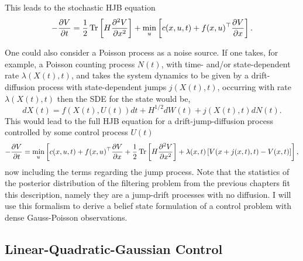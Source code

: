 This leads to the stochastic HJB equation
\begin{equation}
\label{eq:stochastic_HJB}
-\frac{\partial V}{\partial t} = \frac{1}{2} \Tr\left[H \frac{\partial^2 V}{\partial x^2} \right] +\min_{u} \left[ c(x,u,t)  + f(x,u)^\top \frac{\partial V}{\partial x}\right].
\end{equation}
\par
One could also consider a Poisson process as a noise source. If one takes, for example, a Poisson counting process $N(t)$, with time- and/or
 state-dependent rate $\lambda(X(t),t)$, and takes the system dynamics to be given by a drift-diffusion process with state-dependent jumps $j(X(t),t)$, occurring with
 rate $\lambda(X(t),t)$ then the SDE for the state would be,
$$
dX(t) = f(X(t),U(t)) dt + H^{1/2} dW(t) + j(X(t),t) dN(t).
$$
This would lead to the full HJB equation for a drift-jump-diffusion process controlled by some control process $U(t)$
\begin{equation}
\label{eq:martingale_HJB}
-\frac{\partial V}{\partial t} = \min_{u} \left[c(x,u,t) + f(x,u)^\top \frac{\partial V}{\partial x} + \frac{1}{2} \Tr\left[H \frac{\partial^2 V}{\partial x^2} \right] + \lambda(x,t) \left[V(x+j(x,t),t)-V(x,t)\right]\right],
\end{equation}
now including the terms regarding the jump process. Note that the statistics of the posterior distribution of the filtering problem from the previous
chapters fit this description, namely they are a jump-drift processes with no diffusion. I will use this formalism to derive a belief state formulation of a control problem with dense
Gauss-Poisson observations.

\subsection{Linear-Quadratic-Gaussian Control}

